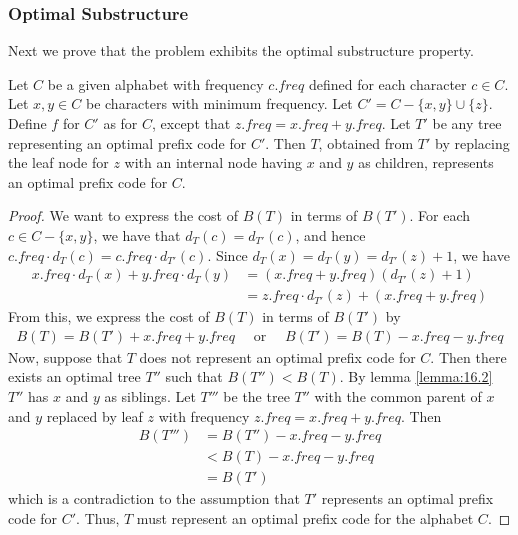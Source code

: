 \subsubsection{Optimal Substructure}
Next we prove that the problem exhibits the optimal substructure property.
\begin{lemma} \cite[16.3, p. 435]{clrs}
\textnormal
{
	Let $C$ be a given alphabet with frequency $c.freq$ defined for each
	character $c \in C$. Let $x, y \in C$ be characters with minimum frequency.
	Let $C' = C - \{x, y\} \cup \{z\}$. Define $f$ for $C'$ as for $C$, except
	that $z.freq = x.freq + y.freq$. Let $T'$ be any tree representing an
	optimal prefix code for $C'$. Then $T$, obtained from $T'$ by replacing
	the leaf node for $z$ with an internal node having $x$ and $y$ as children,
	represents an optimal prefix code for $C$.
}
\end{lemma}

\begin{proof}
	We want to express the cost of $B(T)$ in terms of $B(T')$. For each $c \in
	C - \{x, y\}$, we have that $d_T(c) = d_{T'}(c)$, and hence $c.freq \cdot
	d_T(c) = c.freq \cdot d_{T'}(c)$. Since $d_T(x) = d_T(y) = d_{T'}(z) + 1$,
	we have
	\begin{align}
		x.freq \cdot d_T(x) + y.freq \cdot d_T(y)
		&= (x.freq + y.freq)(d_{T'}(z) + 1) \\
		&= z.freq \cdot d_{T'}(z) + (x.freq + y.freq)
	\end{align}
	From this, we express the cost of $B(T)$ in terms of $B(T')$ by
	\begin{align}
		B(T) = B(T') + x.freq + y.freq
		\quad \text{ or } \quad
		B(T') = B(T) - x.freq - y.freq
	\end{align}
	Now, suppose that $T$ does not represent an optimal prefix code for $C$.
	Then there exists an optimal tree $T''$ such that $B(T'') < B(T)$. By
	lemma \ref{lemma:16.2} $T''$ has $x$ and $y$ as siblings. Let $T'''$ be
	the tree $T''$ with the common parent of $x$ and $y$ replaced by leaf $z$
	with frequency $z.freq = x.freq + y.freq$. Then
	\begin{align}
		B(T''') &= B(T'') - x.freq - y.freq \\
		&< B(T) - x.freq - y.freq \\
		&= B(T')
	\end{align}
	which is a contradiction to the assumption that $T'$ represents an optimal
	prefix code for $C'$. Thus, $T$ must represent an optimal prefix code for
	the alphabet $C$.
\end{proof}

